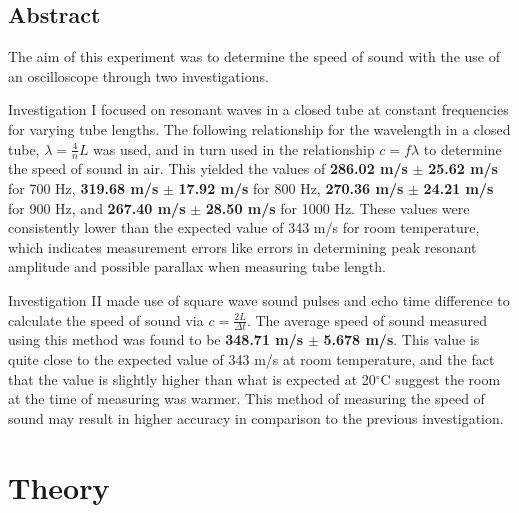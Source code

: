 \documentclass[12pt]{article}
\begin{document}
\begin{center}
    \section*{Abstract}
    \thispagestyle{empty}
\end{center}

The aim of this experiment was to determine the speed of sound with the use of an oscilloscope through two investigations. 

Investigation I focused on resonant waves in a closed tube
at constant frequencies for varying tube lengths. The following relationship for the wavelength in a closed tube, $\lambda = \tfrac{4}{n}L$ was used, and in turn used in the relationship $c=f\lambda$ to
determine the speed of sound in air. This yielded the values of \textbf{286.02 m/s} $\mathbf{\pm}$ \textbf{25.62 m/s} for 700 Hz, \textbf{319.68 m/s} $\mathbf{\pm}$ \textbf{17.92 m/s} for 800 Hz,
\textbf{270.36 m/s} $\mathbf{\pm}$ \textbf{24.21 m/s} for 900 Hz, and \textbf{267.40 m/s} $\mathbf{\pm}$ \textbf{28.50 m/s} for 1000 Hz. These values were consistently lower than the expected value of 343 m/s for room temperature,
which indicates measurement errors like errors in determining peak resonant amplitude and possible parallax when measuring tube length.

Investigation II made use of square wave sound pulses and echo time difference to calculate the speed of sound via $c = \tfrac{2L}{\Delta t}$. The average speed of sound measured using this method was found to be
\textbf{348.71 m/s} $\mathbf{\pm}$ \textbf{5.678 m/s}. This value is quite close to the expected value of 343 m/s at room temperature, and the fact that the value is slightly higher than what is expected at 20$^{\circ}$C suggest the room at the time of
measuring was warmer. This method of measuring the speed of sound may result in higher accuracy in comparison to the previous investigation.

\newpage

\tableofcontents
\thispagestyle{empty}

\newpage


\setcounter{page}{1}
\section{Theory} \label{sec:1}
\end{document}

